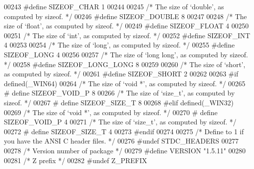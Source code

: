\begin{DoxyCode}
00243 \textcolor{preprocessor}{#define SIZEOF\_CHAR 1}
00244 
00245 \textcolor{comment}{/* The size of `double', as computed by sizeof. */}
00246 \textcolor{preprocessor}{#define SIZEOF\_DOUBLE 8}
00247 
00248 \textcolor{comment}{/* The size of `float', as computed by sizeof. */}
00249 \textcolor{preprocessor}{#define SIZEOF\_FLOAT 4}
00250 
00251 \textcolor{comment}{/* The size of `int', as computed by sizeof. */}
00252 \textcolor{preprocessor}{#define SIZEOF\_INT 4}
00253 
00254 \textcolor{comment}{/* The size of `long', as computed by sizeof. */}
00255 \textcolor{preprocessor}{#define SIZEOF\_LONG 4}
00256 
00257 \textcolor{comment}{/* The size of `long long', as computed by sizeof. */}
00258 \textcolor{preprocessor}{#define SIZEOF\_LONG\_LONG 8}
00259 
00260 \textcolor{comment}{/* The size of `short', as computed by sizeof. */}
00261 \textcolor{preprocessor}{#define SIZEOF\_SHORT 2}
00262 
00263 \textcolor{preprocessor}{#if defined(\_WIN64)}
00264     \textcolor{comment}{/* The size of `void *', as computed by sizeof. */}
00265 \textcolor{preprocessor}{#   define SIZEOF\_VOID\_P 8}
00266     \textcolor{comment}{/* The size of `size\_t', as computed by sizeof. */}
00267 \textcolor{preprocessor}{#    define SIZEOF\_SIZE\_T 8}
00268 \textcolor{preprocessor}{#elif defined(\_WIN32)}
00269     \textcolor{comment}{/* The size of `void *', as computed by sizeof. */}
00270 \textcolor{preprocessor}{#   define SIZEOF\_VOID\_P 4}
00271     \textcolor{comment}{/* The size of `size\_t', as computed by sizeof. */}
00272 \textcolor{preprocessor}{#    define SIZEOF\_SIZE\_T 4}
00273 \textcolor{preprocessor}{#endif}
00274 
00275 \textcolor{comment}{/* Define to 1 if you have the ANSI C header files. */}
00276 \textcolor{preprocessor}{#undef STDC\_HEADERS}
00277 
00278 \textcolor{comment}{/* Version number of package */}
00279 \textcolor{preprocessor}{#define VERSION "1.5.11"}
00280 
00281 \textcolor{comment}{/* Z prefix */}
00282 \textcolor{preprocessor}{#undef Z\_PREFIX}
\end{DoxyCode}
